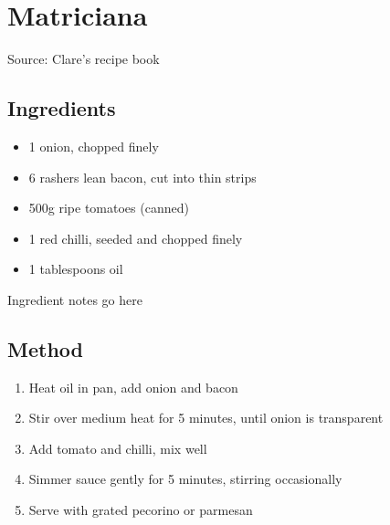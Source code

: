 \section{Matriciana}


Source: Clare's recipe book

\subsection{Ingredients}

\begin{itemize}
    \item 1 onion, chopped finely
    \item 6 rashers lean bacon, cut into thin strips
    \item 500g ripe tomatoes (canned)
    \item 1 red chilli, seeded and chopped finely
    \item 1 tablespoons oil
\end{itemize}

Ingredient notes go here

\subsection{Method}

\begin{enumerate}
    \item Heat oil in pan, add onion and bacon
    \item Stir over medium heat for 5 minutes, until onion is transparent
    \item Add tomato and chilli, mix well
    \item Simmer sauce gently for 5 minutes, stirring occasionally
    \item Serve with grated pecorino or parmesan
\end{enumerate}
